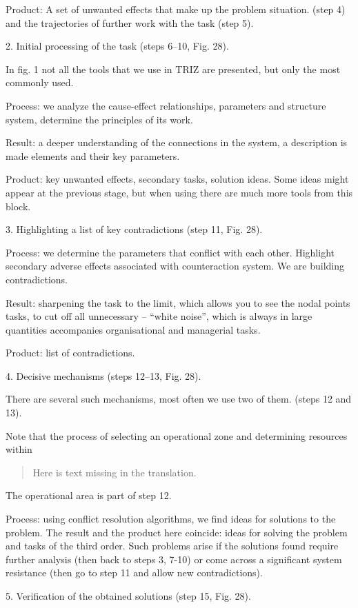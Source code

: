 \documentclass[11pt,a4paper]{book}
\newcommand{\Missing}{
  \begin{quote} Here is text missing in the translation.\end{quote}
}
\begin{document}
Product: A set of unwanted effects that make up the problem situation.  (step
4) and the trajectories of further work with the task (step 5).

2. Initial processing of the task (steps 6–10, Fig. 28).

In fig. 1 not all the tools that we use in TRIZ are presented, but only the
most commonly used.

Process: we analyze the cause-effect relationships, parameters and structure
system, determine the principles of its work.

Result: a deeper understanding of the connections in the system, a description
is made elements and their key parameters.

Product: key unwanted effects, secondary tasks, solution ideas.  Some ideas
might appear at the previous stage, but when using there are much more tools
from this block.

3. Highlighting a list of key contradictions (step 11, Fig. 28).

Process: we determine the parameters that conflict with each other.  Highlight
secondary adverse effects associated with counteraction system. We are
building contradictions.

Result: sharpening the task to the limit, which allows you to see the nodal
points tasks, to cut off all unnecessary -- “white noise”, which is always in
large quantities accompanies organisational and managerial tasks.

Product: list of contradictions.

4. Decisive mechanisms (steps 12–13, Fig. 28).

There are several such mechanisms, most often we use two of them.  (steps 12
and 13).

Note that the process of selecting an operational zone and determining
resources within

\Missing

The operational area is part of step 12.

Process: using conflict resolution algorithms, we find ideas for solutions to
the problem.  The result and the product here coincide: ideas for solving the
problem and tasks of the third order. Such problems arise if the solutions
found require further analysis (then back to steps 3, 7-10) or come across a
significant system resistance (then go to step 11 and allow new
contradictions).

5. Verification of the obtained solutions (step 15, Fig. 28).
\end{document}
